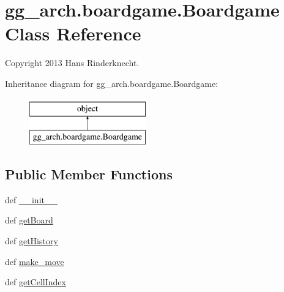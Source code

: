 \hypertarget{classgg__arch_1_1boardgame_1_1_boardgame}{\section{gg\-\_\-arch.\-boardgame.\-Boardgame Class Reference}
\label{classgg__arch_1_1boardgame_1_1_boardgame}
}


Copyright 2013 Hans Rinderknecht.  


Inheritance diagram for gg\-\_\-arch.\-boardgame.\-Boardgame\-:\begin{figure}[H]
\begin{center}
\leavevmode
\includegraphics[height=2.000000cm]{classgg__arch_1_1boardgame_1_1_boardgame}
\end{center}
\end{figure}
\subsection*{Public Member Functions}
\begin{DoxyCompactItemize}
\item 
def \hyperlink{classgg__arch_1_1boardgame_1_1_boardgame_a9fabc6d25f2732b81c46c20fcc84890a}{\-\_\-\-\_\-init\-\_\-\-\_\-}
\item 
def \hyperlink{classgg__arch_1_1boardgame_1_1_boardgame_a241fc5e6df46e0a3b91214730e5ca7ca}{get\-Board}
\item 
def \hyperlink{classgg__arch_1_1boardgame_1_1_boardgame_ad09b9d93abd9c2ddbfb8f30cd3ba024f}{get\-History}
\item 
def \hyperlink{classgg__arch_1_1boardgame_1_1_boardgame_ac8990eebf22549f1ac0f1130414f4494}{make\-\_\-move}
\item 
def \hyperlink{classgg__arch_1_1boardgame_1_1_boardgame_a7918e8105d6d6978eb8b6b9f7a2aacf7}{get\-Cell\-Index}
\end{DoxyCompactItemize}
